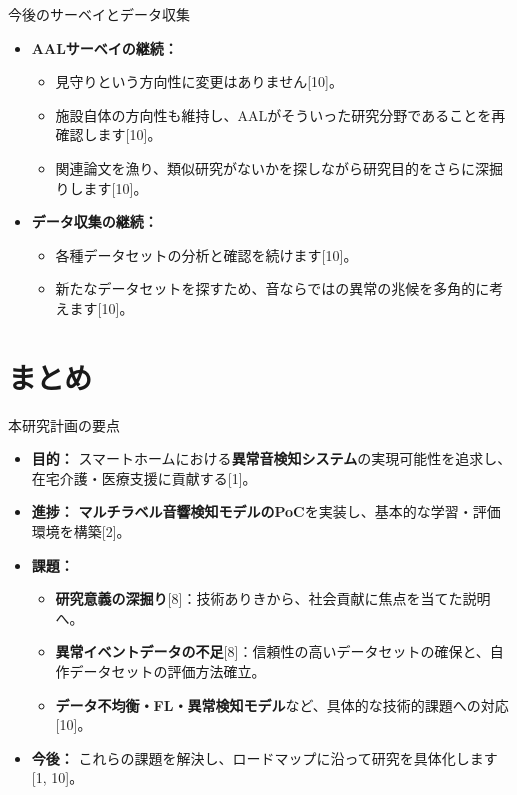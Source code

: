 \documentclass[unicode,12pt,aspectratio=169,dvipdfmx]{beamer}
\begin{document}
\begin{frame}{今後のサーベイとデータ収集} %
    \begin{itemize}
        \item \textbf{AALサーベイの継続：}
        \begin{itemize}
            \item 見守りという方向性に変更はありません[10]。
            \item 施設自体の方向性も維持し、AALがそういった研究分野であることを再確認します[10]。
            \item 関連論文を漁り、類似研究がないかを探しながら研究目的をさらに深掘りします[10]。
        \end{itemize}
        \item \textbf{データ収集の継続：}
        \begin{itemize}
            \item 各種データセットの分析と確認を続けます[10]。
            \item 新たなデータセットを探すため、音ならではの異常の兆候を多角的に考えます[10]。
        \end{itemize}
    \end{itemize}
\end{frame}

\section{まとめ} %
\begin{frame}{本研究計画の要点}
    \begin{itemize}
        \item \textbf{目的：} スマートホームにおける\textbf{異常音検知システム}の実現可能性を追求し、在宅介護・医療支援に貢献する[1]。
        \item \textbf{進捗：} \textbf{マルチラベル音響検知モデルのPoC}を実装し、基本的な学習・評価環境を構築[2]。
        \item \textbf{課題：}
        \begin{itemize}
            \item \textbf{研究意義の深掘り}[8]：技術ありきから、社会貢献に焦点を当てた説明へ。
            \item \textbf{異常イベントデータの不足}[8]：信頼性の高いデータセットの確保と、自作データセットの評価方法確立。
            \item \textbf{データ不均衡・FL・異常検知モデル}など、具体的な技術的課題への対応[10]。
        \end{itemize}
        \item \textbf{今後：} これらの課題を解決し、ロードマップに沿って研究を具体化します[1, 10]。
    \end{itemize}
\end{frame}
\end{document}
